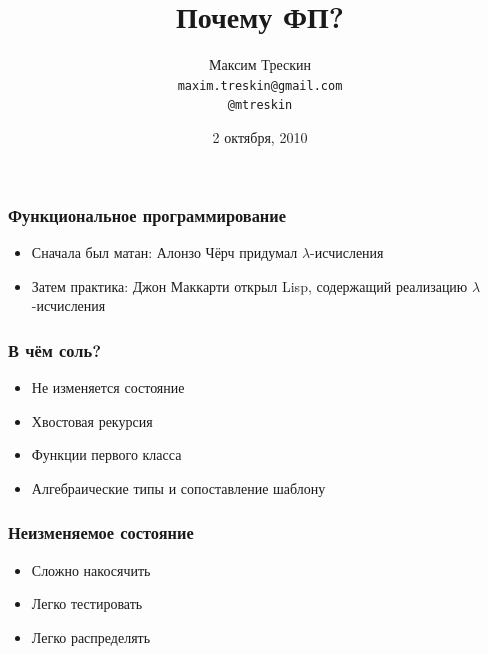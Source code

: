 \documentclass{beamer}
\title{Почему ФП?}
\author{Максим Трескин\\ \texttt{maxim.treskin@gmail.com} \\ \texttt{@mtreskin}}
\date[2010.10.02]{2 октября, 2010}
\begin{document}
\begin{frame}
  \titlepage
\end{frame}




\begin{frame}
  \frametitle{Функциональное программирование}
  \begin{itemize}
  \item Сначала был матан: Алонзо Чёрч придумал $\lambda$-исчисления
    \pause
  \item Затем практика: Джон Маккарти открыл Lisp, содержащий реализацию $\lambda$-исчисления
  \end{itemize}
\end{frame}


\begin{frame}
  \frametitle{В чём соль?}
  \begin{itemize}
  \item Не изменяется состояние
    \pause
  \item Хвостовая рекурсия
    \pause
  \item Функции первого класса
    \pause
  \item Алгебраические типы и сопоставление шаблону
  \end{itemize}
\end{frame}

\begin{frame}
  \frametitle{Неизменяемое состояние}
  \begin{itemize}
  \item Сложно накосячить
    \pause
  \item Легко тестировать
    \pause
  \item Легко распределять
  \end{itemize}
\end{frame}
\end{document}
